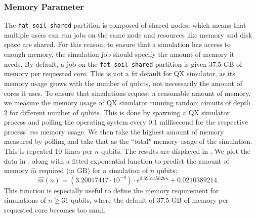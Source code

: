 \subsubsection{Memory Parameter}
The \texttt{fat_soil_shared} partition is composed of shared nodes, which means that multiple users can run jobs on the same node and resources like memory and disk space are shared.
For this reason, to ensure that a simulation has access to enough memory, the simulation job should specify the amount of memory it needs.
By default, a job on the \texttt{fat_soil_shared} partition is given $37.5$ GB of memory per requested core.
This is not a fit default for QX simulator, as its memory usage grows with the number of qubits, not necessarily the amount of cores it uses.
To ensure that simulations request a reasonable amount of memory, we measure the memory usage of QX simulator running random circuits of depth 2 for different number of qubits.
This is done by spawning a QX simulator process and polling the operating system every 0.1 millisecond for the respective process' \gls{rss} memory usage.
We then take the highest amount of memory measured by polling and take that as the ``total" memory usage of the simulation.
This is repeated 10 times per $n$ qubits.
The results are displayed in .
We plot the data in , along with a fitted exponential function to predict the amount of memory $\hat{m}$ required (in GB) for a simulation of $n$ qubits:
\begin{equation}
\hat{m}(n) = \left(3.20017417 \cdot 10^{-8}\right) \cdot e^{0.693145626n} + 0.0210389214.
\end{equation}
This function is especially useful to define the memory requirement for simulations of $n \ge 31$ qubits, where the default of $37.5$ GB of memory per requested core becomes too small.

